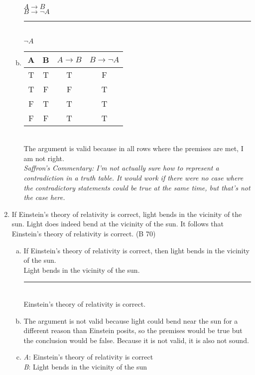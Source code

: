 \documentclass{article}
\begin{document}
\begin{enumerate}
\begin{enumerate}[(a)]
                        $A \to B$\\
                        $B \to \neg A$\\
                        \rule{5em}{.5pt}\\
                        $\neg A$
                  \item
                        \begin{tabular}{c|c|c|c}
                              A                      & B & $A \to B$ & $B \to \neg A$ \\
                              \hline
                              \rowcolor{lightgray} T & T & T         & F              \\
                              \rowcolor{lightgray} T & F & F         & T              \\
                              F                      & T & T         & T              \\
                              F                      & F & T         & T              \\
                        \end{tabular} \\
                        The argument is valid because in all rows where the premises are met, I am not right.\\
                        \textit{Saffron's Commentary: I'm not actually sure how to represent a contradiction in a truth table. It would work if there were no case where the contradictory statements could be true at the same time, but that's not the case here.}
            \end{enumerate}
      \item If Einstein's theory of relativity is correct, light bends in the vicinity of the sun. Light does indeed bend at the vicinity of the sun. It follows that Einstein's theory of relativity is correct. (B 70)
            \begin{enumerate}[(a)]
                  \item If Einstein's theory of relativity is correct, then light bends in the vicinity of the sun.\\
                        Light bends in the vicinity of the sun.\\
                        \rule{15em}{.5pt}\\
                        Einstein's theory of relativity is correct.
                  \item The argument is not valid because light could bend near the sun for a different reason than Einstein posits, so the premises would be true but the conclusion would be false. Because it is not valid, it is also not sound.
                  \item \textit{A}: Einstein's theory of relativity is correct\\
                        \textit{B}: Light bends in the vicinity of the sun


\end{enumerate}
\end{enumerate}
\end{document}
